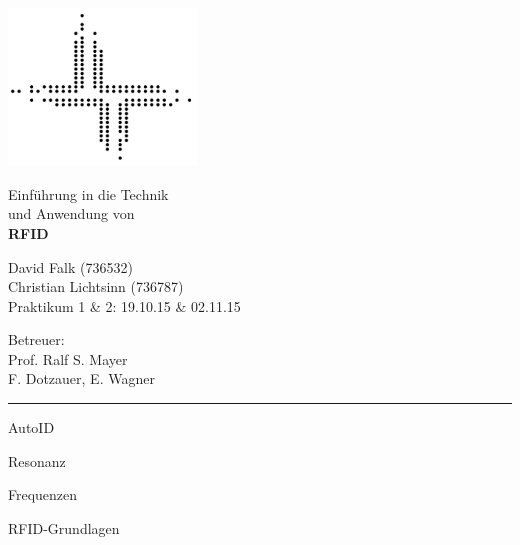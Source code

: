 \documentclass[a4paper,12pt]{scrartcl}
\newcommand\HRule{\noindent\rule{\linewidth}{1.5pt}}
\begin{document}
\begin{titlepage}

\begin{minipage}[c]{5cm}
\includegraphics[width=5cm]{logohdafbi-standalone}
\end{minipage}
\hfil
\begin{minipage}[c]{10cm}
\begin{flushright}
\Large Einführung in die Technik\\und Anwendung von\\
\LARGE \textbf{RFID}
\end{flushright}
\end{minipage}

\vspace*{1cm}

\begin{minipage}[c]{8cm}
\begin{flushleft}
\large David Falk (736532)\\Christian Lichtsinn (736787)\\Praktikum 1 \& 2: 19.10.15 \& 02.11.15
\end{flushleft}
\end{minipage}
\hfil
\begin{minipage}[c]{8cm}
\begin{flushright}
\large Betreuer:\\Prof. Ralf S. Mayer\\F. Dotzauer, E. Wagner
\end{flushright}
\end{minipage}

\vspace*{1cm}

\HRule


\centering
\huge

\begin{bfseries}
AutoID

Resonanz

Frequenzen

RFID-Grundlagen
\end{bfseries}


\end{titlepage}
\end{document}
